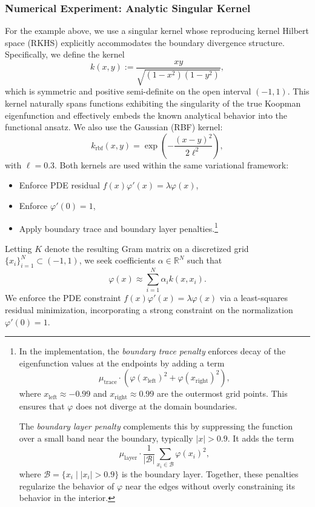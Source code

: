 \documentclass[11pt]{article}
\theoremstyle{plain}
\def\[{\begin{equation}}
\def\]{\end{equation}}
\begin{document}
\subsubsection*{Numerical Experiment: Analytic Singular Kernel}

For the example above, we use a singular kernel whose reproducing kernel Hilbert space (RKHS) explicitly accommodates the boundary divergence structure. Specifically, we define the kernel
\[
k(x, y) := \frac{x y}{\sqrt{(1 - x^2)(1 - y^2)}},
\]
which is symmetric and positive semi-definite on the open interval $(-1, 1)$. This kernel naturally spans functions exhibiting the singularity of the true Koopman eigenfunction and effectively embeds the known analytical behavior into the functional ansatz. We also use the 
  {Gaussian (RBF) kernel}:
    \[
    k_{\mathrm{rbf}}(x, y) = \exp\left(-\frac{(x - y)^2}{2\ell^2}\right),
    \]
    with \(\ell = 0.3\). Both kernels are used within the same variational framework:
\begin{itemize}
    \item Enforce PDE residual \(f(x)\varphi'(x) = \lambda \varphi(x)\),
    \item Enforce \(\varphi'(0) = 1\),

  \item Apply boundary trace and boundary layer penalties.\footnote{In the implementation, the \emph{boundary trace penalty} enforces decay of the eigenfunction values at the endpoints by adding a term
  \[
  \mu_{\mathrm{trace}} \cdot \left(\varphi(x_{\mathrm{left}})^2 + \varphi(x_{\mathrm{right}})^2\right),
  \]
  where \(x_{\mathrm{left}} \approx -0.99\) and \(x_{\mathrm{right}} \approx 0.99\) are the outermost grid points. This ensures that $\varphi$ does not diverge at the domain boundaries. 

  The \emph{boundary layer penalty} complements this by suppressing the function over a small band near the boundary, typically $|x| > 0.9$. It adds the term
  \[
  \mu_{\mathrm{layer}} \cdot \frac{1}{|\mathcal{B}|} \sum_{x_i \in \mathcal{B}} \varphi(x_i)^2,
  \]
  where $\mathcal{B} = \{x_i \mid |x_i| > 0.9\}$ is the boundary layer. Together, these penalties regularize the behavior of $\varphi$ near the edges without overly constraining its behavior in the interior.}
\end{itemize}



Letting $K$ denote the resulting Gram matrix on a discretized grid $\{x_i\}_{i=1}^N \subset (-1,1)$, we seek coefficients $\alpha \in \mathbb{R}^N$ such that
\[
\varphi(x) \approx \sum_{i=1}^N \alpha_i k(x, x_i).
\]
We enforce the PDE constraint $f(x) \varphi'(x) = \lambda \varphi(x)$ via a least-squares residual minimization, incorporating a strong constraint on the normalization $\varphi'(0) = 1$.
\end{document}
